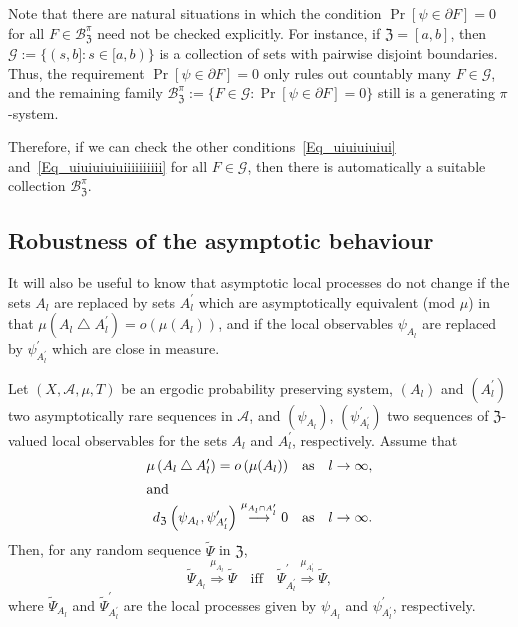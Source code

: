 \documentclass[AHL,Unicode,longabstracts]{cedram}
\newcommand{\clA}{\mathcal{A}}
\newcommand{\clB}{\mathcal{B}}
\newcommand{\clG}{\mathcal{G}}
\newcommand{\frkZ}{\mathfrak{Z}}
\begin{document}
\begin{rema}
Note that there are natural situations in which the condition $\Pr[\psi\in\partial F]=0$ for all $F\in\clB_{\frkZ}^{\pi}$ need not be checked explicitly. For instance, if $\frkZ=[a,b]$, then $\clG:=\{(s,b]:s\in\lbrack a,b)\}$ is a collection of sets with pairwise disjoint boundaries. Thus, the requirement $\Pr[\psi\in\partial F]=0$ only rules out countably many $F\in\clG$, and the remaining family $\clB_{\frkZ}^{\pi }:=\{F\in\clG:\Pr[\psi\in\partial F]=0\}$ still is a generating $\pi$-system.

Therefore, if we can check the other conditions~\eqref{Eq_uiuiuiuiui} and~\eqref{Eq_uiuiuiuiuiiiiiiiiii} for all $F\in\clG$, then there is automatically a suitable collection $\clB_{\frkZ}^{\pi}$.
\end{rema}



\subsection{Robustness of the asymptotic behaviour}
It will also be useful to know that asymptotic local processes do not change if the sets $A_{l}$ are replaced by sets $A_{l}^{\prime}$ which are asymptotically equivalent (mod $\mu$) in that $\mu(A_{l}\bigtriangleup A_{l}^{\prime})=o(\mu(A_{l}))$, and if the local observables $\psi_{A_{l}}$ are replaced by $\psi_{A_{l}^{\prime} }^{\prime}$ which are close in measure.

\begin{theo}\label{Thm_RobustLocProc}
Let $(X,\clA,\mu,T)$ be an ergodic probability preserving system, $(A_{l})$ and $(A_{l}^{\prime})$ two asymptotically rare sequences in $\clA$, and $(\psi_{A_{l}})$, $(\psi_{A_{l}^{\prime}}^{\prime})$ two sequences of $\frkZ$-valued local observables for the sets $A_{l}$ and $A_{l}^{\prime}$, respectively. Assume that
\begin{align}
\mu\left(A_{l}\bigtriangleup A_{l}^{\prime}\right)=o\left(\mu(A_{l})\right)\quad &\text{as}\quad l\rightarrow\infty, \label{Eq_hbhbhbhbhb}
\\
\intertext{and}
d_{\frkZ}\left(\psi_{A_{l}},\psi_{A_{l}^{\prime}}^{\prime}\right)\overset {\mu_{A_{l}\cap A_{l}^{\prime}}}{\longrightarrow}0 \quad &\text{as}\quad l\rightarrow\infty. \label{Eq_LocalObsAsySameInMeasure}
\end{align}
Then, for any random sequence $\widetilde{\Psi}$  in $\frkZ$,
\begin{equation}
\widetilde{\Psi}_{A_{l}}\overset{\mu_{A_{l}}}{\Longrightarrow}\widetilde{\Psi }\quad\text{iff}\quad\widetilde{\Psi}_{A_{l}^{\prime}}^{\prime}
\overset{\mu_{A_{l}^{\prime}}}{\Longrightarrow}\widetilde{\Psi},
\end{equation}
where $\widetilde{\Psi}_{A_{l}}$ and $\widetilde{\Psi}_{A_{l}^{\prime} }^{\prime}$ are the local processes given by $\psi_{A_{l}}$ and $\psi _{A_{l}^{\prime}}^{\prime}$, respectively.
\end{theo}
\end{document}

